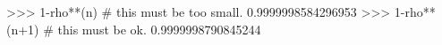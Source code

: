 
>>> 1-rho**(n) #  this must be too small.
0.9999998584296953
>>> 1-rho**(n+1) # this must be ok.
0.9999998790845244

